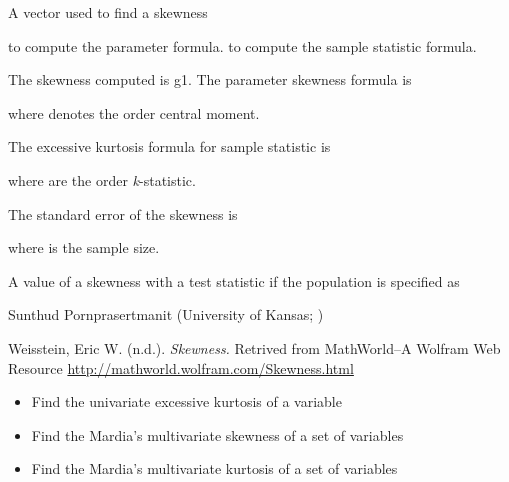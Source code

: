 \documentclass[a4paper]{book}
\begin{document}
%
\begin{Arguments}
\begin{ldescription}
\item[\code{object}] 
A vector used to find a skewness

\item[\code{population}] 
 to compute the parameter formula.  to compute the sample statistic formula.

\end{ldescription}
\end{Arguments}
%
\begin{Details}\relax
The skewness computed is g1. The parameter skewness  formula is


where  denotes the  order central moment.

The excessive kurtosis formula for sample statistic  is


where  are the  order \emph{k}-statistic.

The standard error of the skewness is 


where  is the sample size.
\end{Details}
%
\begin{Value}
A value of a skewness with a test statistic if the population is specified as 
\end{Value}
%
\begin{Author}\relax
Sunthud Pornprasertmanit (University of Kansas; )
\end{Author}
%
\begin{References}\relax
Weisstein, Eric W. (n.d.). \emph{Skewness.} Retrived from MathWorld--A Wolfram Web Resource \url{http://mathworld.wolfram.com/Skewness.html} 
\end{References}
%
\begin{SeeAlso}\relax
\begin{itemize}

\item {} Find the univariate excessive kurtosis of a variable
\item {} Find the Mardia's multivariate skewness of a set of variables
\item {} Find the Mardia's multivariate kurtosis of a set of variables

\end{itemize}

\end{SeeAlso}
\end{document}
